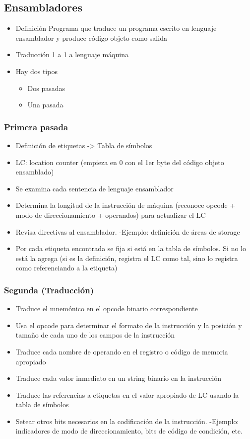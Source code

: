 \subsection{Ensambladores}
	\begin{itemize}
	\item Definición Programa que traduce un programa escrito en lenguaje ensamblador y produce código objeto como salida
	\item Traducción 1 a 1 a lenguaje máquina
	\item Hay dos tipos
		\begin{itemize}
		\item Dos pasadas
		\item Una pasada
		\end{itemize}	
	\end{itemize}	


	\subsubsection{Primera pasada}
		\begin{itemize}
		\item Definición de etiquetas -> Tabla de símbolos
		\item LC: location counter (empieza en 0 con el 1er byte del código objeto ensamblado)
		\item Se examina cada sentencia de lenguaje ensamblador
		\item Determina la longitud de la instrucción de máquina (reconoce opcode + modo de direccionamiento + operandos) para actualizar el LC
		\item Revisa directivas al ensamblador.
			-Ejemplo: definición de áreas de storage
		\item Por cada etiqueta encontrada se fija si está en la tabla de símbolos. Si no lo está la agrega (si es la definición, registra el LC como tal, sino lo registra como referenciando a la etiqueta)
		\end{itemize}	


	\subsubsection{Segunda (Traducción)}
		\begin{itemize}
		\item Traduce el mnemónico en el opcode binario correspondiente
		\item Usa el opcode para determinar el formato de la instrucción y la posición y tamaño de cada uno de los campos de la instrucción
		\item Traduce cada nombre de operando en el registro o código de memoria apropiado
		\item Traduce cada valor inmediato en un string binario en la instrucción
		\item Traduce las referencias a etiquetas en el valor apropiado de LC usando la tabla de símbolos
		\item Setear otros bits necesarios en la codificación de la instrucción.
			-Ejemplo: indicadores de modo de direccionamiento, bits de código de condición, etc.
		\end{itemize}	

